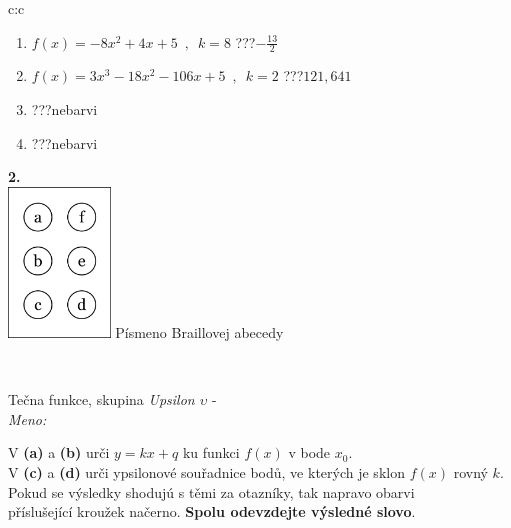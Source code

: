 \documentclass[10pt]{report}
\begin{document}
\begin{tabular}{c:c}
\begin{minipage}[c][104.5mm][t]{0.5\linewidth}
\begin{center}
\begin{minipage}{0.79\linewidth}
\begin{center}
\begin{varwidth}{\linewidth}
\begin{enumerate}
\item $f(x)=-8x^2+4x+5\enspace , \enspace k=8$\quad \dotfill\; ???\;\dotfill \quad $-\frac{13}{2}$
\item $f(x)=3x^3-18x^2-106x+5\enspace , \enspace k=2$\quad \dotfill\; ???\;\dotfill \quad $121 , 641$
\item \quad \dotfill\; ???\;\dotfill \quad nebarvi
\item \quad \dotfill\; ???\;\dotfill \quad nebarvi
\end{enumerate}
\end{varwidth}
\end{center}
\end{minipage}
\begin{minipage}{0.20\linewidth}
\begin{center}
{\Huge\bfseries 2.} \\[2mm]
\includegraphics[height=40mm]{../images/braille.png}
{\small Písmeno Braillovej abecedy}
\end{center}
\end{minipage}
\end{center}
\end{minipage}
\\ \hdashline
\begin{minipage}[c][104.5mm][t]{0.5\linewidth}
\begin{center}
\vspace{7mm}
{\huge Tečna funkce, skupina \textit{Upsilon $\upsilon$} -}\\[5mm]
\textit{Meno:}\phantom{xxxxxxxxxxxxxxxxxxxxxxxxxxxxxxxxxxxxxxxxxxxxxxxxxxxxxxxxxxxxxxxxx}\\[5mm]
\begin{minipage}{0.95\linewidth}
\begin{center}
V \textbf{(a)} a \textbf{(b)} urči  $y = kx + q$ ku funkci $f(x)$ v bode $x_0$.\\V \textbf{(c)} a \textbf{(d)} urči ypsilonové souřadnice bodů, ve kterých je sklon $f(x)$ rovný $k$.\\Pokud se výsledky shodujú s těmi za otazníky, tak napravo obarvi\\příslušející kroužek načerno. \textbf{Spolu odevzdejte výsledné slovo}.

\end{center}
\end{minipage}
\end{center}
\end{minipage}
\end{tabular}
\end{document}
